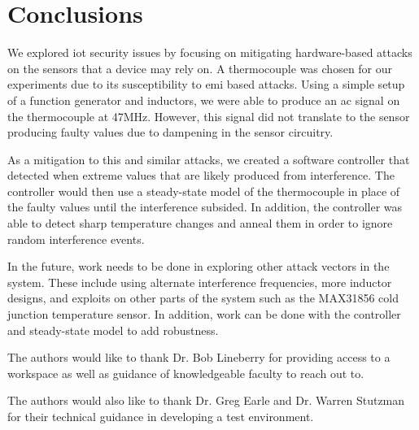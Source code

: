 \section{Conclusions}\label{conc}
We explored \ac{iot} security issues by focusing on mitigating hardware-based attacks on the sensors that a device may rely on. A thermocouple was chosen for our experiments due to its susceptibility to \ac{emi} based attacks. Using a simple setup of a function generator and inductors, we were able to produce an \ac{ac} signal on the thermocouple at 47MHz. However, this signal did not translate to the sensor producing faulty values due to dampening in the sensor circuitry. 

As a mitigation to this and similar attacks, we created a software controller that detected when extreme values that are likely produced from interference. The controller would then use a steady-state model of the thermocouple in place of the faulty values until the interference subsided. In addition, the controller was able to detect sharp temperature changes and anneal them in order to ignore random interference events.

In the future, work needs to be done in exploring other attack vectors in the system. These include using alternate interference frequencies, more inductor designs, and exploits on other parts of the system such as the MAX31856 cold junction temperature sensor. In addition, work can be done with the controller and steady-state model to add robustness.

\begin{acks}
    The authors would like to thank Dr. Bob Lineberry for providing access to a workspace as well as guidance of knowledgeable faculty to reach out to.
    
    The authors would also like to thank Dr. Greg Earle and Dr. Warren Stutzman for their technical guidance in developing a test environment.
\end{acks}